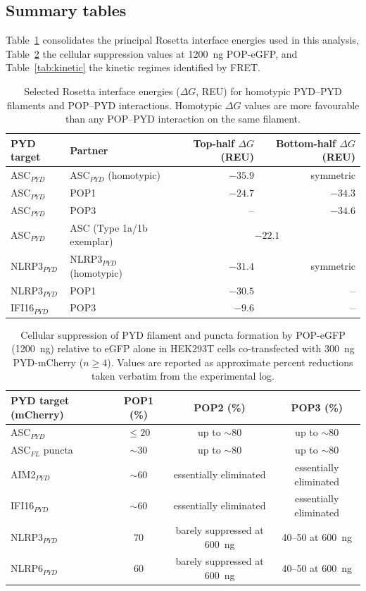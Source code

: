 \documentclass[11pt]{article}
\begin{document}
\subsection{Summary tables}

Table~\ref{tab:rosetta} consolidates the principal Rosetta interface
energies used in this analysis, Table~\ref{tab:cell} the cellular
suppression values at 1200~ng POP-eGFP, and Table~\ref{tab:kinetic} the
kinetic regimes identified by FRET.

\begin{table}[htbp]
\centering
\caption{Selected Rosetta interface energies ($\Delta G$, REU) for
homotypic PYD--PYD filaments and POP--PYD interactions. Homotypic
$\Delta G$ values are more favourable than any POP--PYD interaction on
the same filament.}
\label{tab:rosetta}
\begin{tabular}{llrr}
\toprule
PYD target & Partner & Top-half $\Delta G$ (REU) & Bottom-half
$\Delta G$ (REU) \\
\midrule
ASC$_{PYD}$   & ASC$_{PYD}$ (homotypic)  & $-35.9$ & symmetric \\
ASC$_{PYD}$   & POP1                     & $-24.7$ & $-34.3$ \\
ASC$_{PYD}$   & POP3                     & --      & $-34.6$ \\
ASC$_{PYD}$   & ASC (Type 1a/1b exemplar)& \multicolumn{2}{c}{$-22.1$} \\
NLRP3$_{PYD}$ & NLRP3$_{PYD}$ (homotypic)& $-31.4$ & symmetric \\
NLRP3$_{PYD}$ & POP1                     & $-30.5$ & -- \\
IFI16$_{PYD}$ & POP3                     & $-9.6$  & -- \\
\bottomrule
\end{tabular}
\end{table}

\begin{table}[htbp]
\centering
\caption{Cellular suppression of PYD filament and puncta formation by
POP-eGFP (1200~ng) relative to eGFP alone in HEK293T cells co-transfected
with 300~ng PYD-mCherry ($n \geq 4$). Values are reported as approximate
percent reductions taken verbatim from the experimental log.}
\label{tab:cell}
\begin{tabular}{lccc}
\toprule
PYD target (mCherry) & POP1 (\%) & POP2 (\%) & POP3 (\%) \\
\midrule
ASC$_{PYD}$    & $\leq 20$ & up to $\sim 80$ & up to $\sim 80$ \\
ASC$_{FL}$ puncta & $\sim 30$ & up to $\sim 80$ & up to $\sim 80$ \\
AIM2$_{PYD}$   & $\sim 60$ & essentially eliminated & essentially eliminated \\
IFI16$_{PYD}$  & $\sim 60$ & essentially eliminated & essentially eliminated \\
NLRP3$_{PYD}$  & $70$      & barely suppressed at 600~ng & 40--50 at 600~ng \\
NLRP6$_{PYD}$  & $60$      & barely suppressed at 600~ng & 40--50 at 600~ng \\
\bottomrule
\end{tabular}
\end{table}
\end{document}
